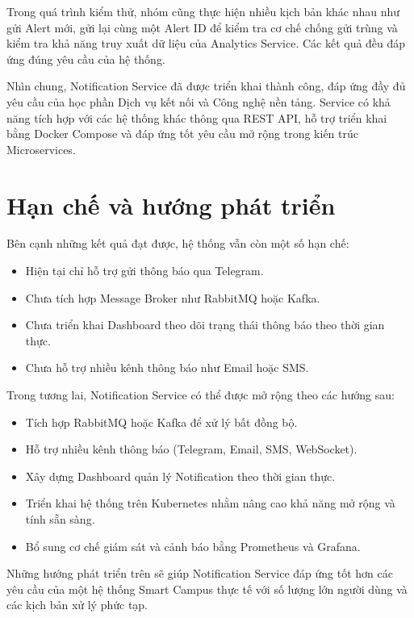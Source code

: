 Trong quá trình kiểm thử, nhóm cũng thực hiện nhiều kịch bản khác nhau như gửi Alert mới, gửi lại cùng một Alert ID để kiểm tra cơ chế chống gửi trùng và kiểm tra khả năng truy xuất dữ liệu của Analytics Service. Các kết quả đều đáp ứng đúng yêu cầu của hệ thống.

Nhìn chung, Notification Service đã được triển khai thành công, đáp ứng đầy đủ yêu cầu của học phần Dịch vụ kết nối và Công nghệ nền tảng. Service có khả năng tích hợp với các hệ thống khác thông qua REST API, hỗ trợ triển khai bằng Docker Compose và đáp ứng tốt yêu cầu mở rộng trong kiến trúc Microservices.


\section{Hạn chế và hướng phát triển}

Bên cạnh những kết quả đạt được, hệ thống vẫn còn một số hạn chế:

\begin{itemize}
\item Hiện tại chỉ hỗ trợ gửi thông báo qua Telegram.
\item Chưa tích hợp Message Broker như RabbitMQ hoặc Kafka.
\item Chưa triển khai Dashboard theo dõi trạng thái thông báo theo thời gian thực.
\item Chưa hỗ trợ nhiều kênh thông báo như Email hoặc SMS.
\end{itemize}

Trong tương lai, Notification Service có thể được mở rộng theo các hướng sau:

\begin{itemize}
\item Tích hợp RabbitMQ hoặc Kafka để xử lý bất đồng bộ.
\item Hỗ trợ nhiều kênh thông báo (Telegram, Email, SMS, WebSocket).
\item Xây dựng Dashboard quản lý Notification theo thời gian thực.
\item Triển khai hệ thống trên Kubernetes nhằm nâng cao khả năng mở rộng và tính sẵn sàng.
\item Bổ sung cơ chế giám sát và cảnh báo bằng Prometheus và Grafana.
\end{itemize}

Những hướng phát triển trên sẽ giúp Notification Service đáp ứng tốt hơn các yêu cầu của một hệ thống Smart Campus thực tế với số lượng lớn người dùng và các kịch bản xử lý phức tạp.
